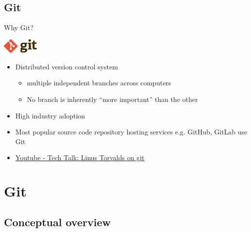 \documentclass{beamer}
\begin{document}
\subsection{Git}

\begin{frame}{Why Git?}
  \begin{center}
    \includegraphics[height=0.75cm]{assets/gitlogo.png}
  \end{center}
  \begin{itemize}
    \item Distributed version control system
      \begin{itemize}
        \item multiple independent branches across computers
        \item No branch is inherently “more important” than the other
      \end{itemize}
    \item High industry adoption
    \item Most popular source code repository hosting services e.g. GitHub,
      GitLab use Git
    \item \href{https://www.youtube.com/watch?v=4XpnKHJAok8}{Youtube - Tech
      Talk: Linus Torvalds on git}
  \end{itemize}
\end{frame}

\section{Git}

\subsection{Conceptual overview}
\end{document}
